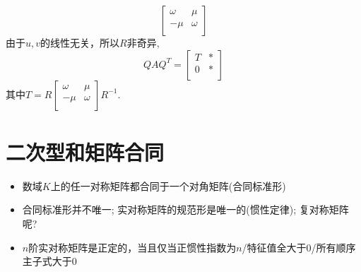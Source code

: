 \begin{itemize}
\begin{solution}
\begin{equation}
		\begin{bmatrix}
			\omega& \mu\\
			-\mu   & \omega\\
		\end{bmatrix}
		\end{equation}
		由于$u,v$的线性无关，所以$R$非奇异,
		\begin{equation}\nonumber
			QAQ^T = 
			\begin{bmatrix}
				T& *\\
				0& *\\
			\end{bmatrix}
		\end{equation}
		其中$T = R
		\begin{bmatrix}
			\omega& \mu\\
			-\mu   & \omega\\
		\end{bmatrix}
		R^{-1}
		$.
	\end{solution}
	\vspace{2cm}
\end{itemize}

\section{二次型和矩阵合同}
\begin{itemize}
\item 数域$K$上的任一对称矩阵都合同于一个对角矩阵(合同标准形)
\item 合同标准形并不唯一; 实对称矩阵的规范形是唯一的(惯性定律); 复对称矩阵呢?
\item $n$阶实对称矩阵是正定的，当且仅当正惯性指数为$n$/特征值全大于0/所有顺序主子式大于0 
\end{itemize}

